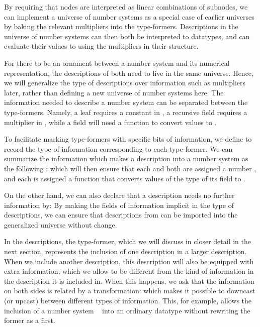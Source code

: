 By requiring that nodes are interpreted as linear combinations of subnodes, we can implement a universe of number systems as a special case of earlier universes by baking the relevant multipliers into the type-formers. Descriptions in the universe of number systems can then both be interpreted to datatypes, and can evaluate their values to \bN{} using the multipliers in their structure.

For there to be an ornament between a number system and its numerical representation, the descriptions of both need to live in the same universe. Hence, we will generalize the type of descriptions over information such as multipliers later, rather than defining a new universe of number systems here. The information needed to describe a number system can be separated between the type-formers. Namely, a leaf  requires a constant in \bN{}, a recursive field  requires a multiplier in \bN{}, while a field  will need a function to convert values to \bN{}.

To facilitate marking type-formers with specific bits of information, we define 
to record the type of information corresponding to each type-former. We can summarize the information which makes a description into a number system as the following :
which will then ensure that each  and  both are assigned a number \bN{}, and each  is assigned a function that converts values of the type of its field to \bN{}.

On the other hand, we can also declare that a description needs no further information by:
By making the fields of information implicit in the type of descriptions, we can ensure that descriptions from  can be imported into the generalized universe without change.


In the descriptions, the  type-former, which we will discuss in closer detail in the next section, represents the inclusion of one description in a larger description. When we include another description, this description will also be equipped with extra information, which we allow to be different from the kind of information in the description it is included in. When this happens, we ask that the information on both sides is related by a transformation:
which makes it possible to downcast (or upcast) between different types of information. This, for example, allows the inclusion of a number system \  into an ordinary datatype  without rewriting the former as a  first.


